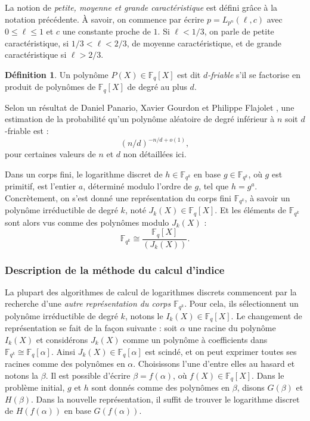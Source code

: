 \documentclass[a4paper, titlepage, 11pt]{article}
\theoremstyle{definition}
\newtheorem{defi}[theo]{Définition}
\theoremstyle{remark}
\def\o{o}
\def\gf #1{\mathbb{F}_{#1}}
\begin{document}
La notion de \textit{petite, moyenne et grande caractéristique} est défini grâce à la notation précédente. À savoir, on commence par écrire $p = L_{p^n}(\ell,c)$ avec $0\leqslant\ell\leqslant 1$ et $c$ une constante proche de $1$. Si $\ell < 1/3$, on parle de petite caractéristique, si $1/3 < \ell < 2/3$, de moyenne caractéristique, et de grande caractéristique si $\ell > 2/3$.

\begin{defi}
Un polynôme $P(X) \in \gf{q}[X]$ est dit \textit{$d$-friable} s'il se factorise en produit de polynômes de $\gf{q}[X]$ de degré au plus $d$.
\end{defi}

Selon un résultat de Daniel Panario, Xavier Gourdon et Philippe Flajolet \cite{PGF98}, une estimation de la probabilité qu'un polynôme aléatoire de degré inférieur à $n$ soit $d$-friable est :
$${(n/d)}^{-n/d + \o(1)},$$
pour certaines valeurs de $n$ et $d$ non détaillées ici.

Dans un corps fini, le logarithme discret de $h \in \gf{q^k}$ en base $g \in \gf{q^k}$, où $g$ est primitif, est l'entier $a$, déterminé modulo l'ordre de $g$, tel que $h = g^a$. Concrètement, on s'est donné une représentation du corps fini $\gf{q^k}$, à savoir un polynôme irréductible de degré $k$, noté $J_k(X) \in \gf{q}[X]$. Et les éléments de $\gf{q^k}$ sont alors vus comme des polynômes modulo $J_k(X)$ :
$$\gf{q^k} \cong \frac{\gf{q}[X]}{(J_k(X))}.$$

\subsubsection{Description de la méthode du calcul d'indice}
La plupart des algorithmes de calcul de logarithmes discrets commencent par la recherche d'une \textit{autre représentation du corps $\gf{q^k}$}. Pour cela, ils sélectionnent un polynôme irréductible de degré $k$, notons le $I_k(X) \in \gf{q}[X]$. Le changement de représentation se fait de la façon suivante : soit $\alpha$ une racine du polynôme $I_k(X)$ et considérons $J_k(X)$ comme un polynôme à coefficients dans $\gf{q^k} \cong \gf{q}[\alpha]$. Ainsi $J_k(X) \in \gf{q}[\alpha]$ est scindé, et on peut exprimer toutes ses racines comme des polynômes en $\alpha$. Choisissons l'une d'entre elles au hasard et notons la $\beta$. Il est possible d'écrire $\beta = f(\alpha)$, où $f(X) \in \gf{q}[X]$. Dans le problème initial, $g$ et $h$ sont donnés comme des polynômes en $\beta$, disons $G(\beta)$ et $H(\beta)$. Dans la nouvelle représentation, il suffit de trouver le logarithme discret de $H(f(\alpha))$ en base $G(f(\alpha))$.
\end{document}
